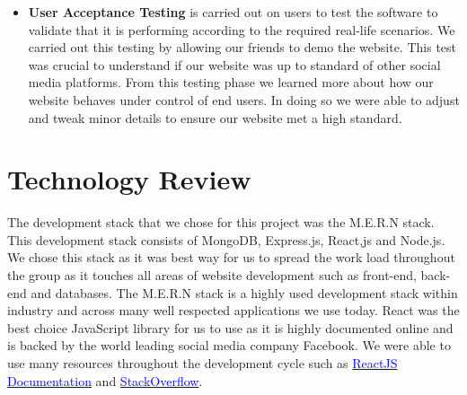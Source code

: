 \begin{itemize}
\item \textbf{User Acceptance Testing}
 is carried out on users to test the software to validate that it is performing according to the required real-life scenarios.\newline
 We carried out this testing by allowing our friends to demo the website. This test was crucial to understand if our website was up to standard of other social media platforms. From this testing phase we learned more about how our website behaves under control of end users. In doing so we were able to adjust and tweak minor details to ensure our website met a high standard.

\end{itemize}


\chapter{Technology Review}

The development stack that we chose for this project was the M.E.R.N stack. This development stack consists of MongoDB, Express.js, React,js and Node.js. We chose this stack as it was best way for us to spread the work load throughout the group as it touches all areas of website development such as front-end, back-end and databases. The M.E.R.N stack is a highly used development stack within industry and across many well respected applications we use today. React was the best choice JavaScript library for us to use as it is highly documented online and is backed by the world leading social media company Facebook. We were able to use many resources throughout the development cycle such as \href{https://reactjs.org/}{\textcolor{blue}{ReactJS Documentation}} and \href{https://stackoverflow.com/}{\textcolor{blue}{StackOverflow}}.
\newline

